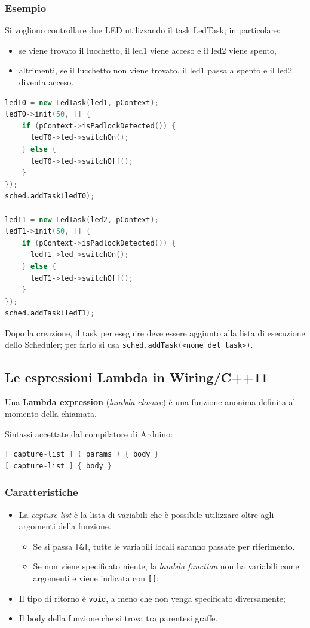\subsubsection{Esempio}
Si vogliono controllare due LED utilizzando il task LedTask; in particolare:
\begin{itemize}
	\item se viene trovato il lucchetto, il led1 viene acceso e il led2 viene spento,
	\item altrimenti, se il lucchetto non viene trovato, il led1 passa a spento e il led2 diventa acceso.
\end{itemize}
\begin{lstlisting}[language=C++,frame=none]
ledT0 = new LedTask(led1, pContext);
ledT0->init(50, [] {
   	if (pContext->isPadlockDetected()) {
   	  ledT0->led->switchOn();
   	} else {
   	  ledT0->led->switchOff();
	}
});
sched.addTask(ledT0);

ledT1 = new LedTask(led2, pContext);
ledT1->init(50, [] {
   	if (pContext->isPadlockDetected()) {
	  ledT1->led->switchOn();
   	} else {
   	  ledT1->led->switchOff();
	}
});
sched.addTask(ledT1);
\end{lstlisting}
Dopo la creazione, il task per eseguire deve essere aggiunto alla lista di esecuzione dello Scheduler; per farlo si usa \texttt{sched.addTask(<nome del task>)}.

\subsection{Le espressioni Lambda in Wiring/C++11}\label{sec:lambda}
Una \textbf{Lambda expression} (\textit{lambda closure}) è una funzione anonima definita al momento della chiamata. 

Sintassi accettate dal compilatore di Arduino:
\begin{lstlisting}[language=C++,frame=none]
[ capture-list ] ( params ) { body }
[ capture-list ] { body } 
\end{lstlisting}

\subsubsection{Caratteristiche}
\begin{itemize}
	\item La \textit{capture list} è la lista di variabili che è possibile utilizzare oltre agli argomenti della funzione.
	\begin{itemize}
		\item Se si passa \texttt{[\&]}, tutte le variabili locali saranno passate per riferimento.
		\item Se non viene specificato niente, la \textit{lambda function} non ha variabili come argomenti e viene indicata con \texttt{[]};
	\end{itemize}
	\item Il tipo di ritorno è \texttt{void}, a meno che non venga specificato diversamente;
	\item Il body della funzione che si trova tra parentesi graffe.
\end{itemize}

